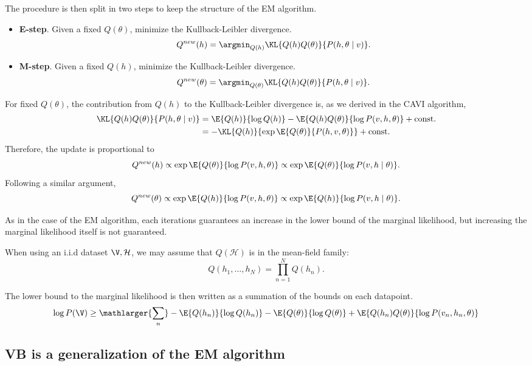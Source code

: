 The procedure is then split in two steps to keep the structure of the EM algorithm.

\begin{itemize}
  \item \textbf{E-step}. Given a fixed \(Q(\theta)\), minimize the Kullback-Leibler divergence.
    \[
    Q^{new}(h) = \argmin_{Q(h)}\KL{Q(h)Q(\theta)}{P(h,\theta \mid v)}.
    \]

  \item \textbf{M-step}. Given a fixed \(Q(h)\), minimize the Kullback-Leibler divergence.
    \[
    Q^{new}(\theta) = \argmin_{Q(\theta)}\KL{Q(h)Q(\theta)}{P(h,\theta \mid v)}.
    \]
\end{itemize}

For fixed \( Q(\theta) \), the contribution from \( Q(h) \) to the Kullback-Leibler divergence is, as we derived in the CAVI algorithm, 
\[
  \begin{aligned}
  \KL{Q(h)Q(\theta)}{P(h,\theta \mid v)} &= \E{Q(h)}{\log Q(h)} - \E{Q(h)Q(\theta)}{\log P(v,h,\theta)} + \text{const.} \\
  &= - \KL{Q(h)}{\exp \E{Q(\theta)}{P(h, v, \theta)}} + \text{const.}
  \end{aligned}
\]
Therefore, the update is proportional to 
\[
   Q^{new}(h) \propto \exp \E{Q(\theta)}{\log P(v,h,\theta)} \propto \exp \E{Q(\theta)}{\log P(v,h \mid \theta)}.
\]
Following a similar argument, 
\[
  Q^{new}(\theta) \propto \exp \E{Q(h)}{\log P(v,h,\theta)} \propto \exp \E{Q(h)}{\log P(v,h \mid \theta)}.
\]

As in the case of the EM algorithm, each iterations guarantees an increase in the lower bound of the marginal likelihood, but increasing the marginal likelihood itself is not guaranteed.

When using an i.i.d dataset \(\V, \mathcal{H}\), we may assume that \(Q(\mathcal{H})\) is in the mean-field family:
\[
  Q(h_{1}, \dots, h_{N}) = \prod_{n=1}^{N}Q(h_{n}).
\]

The lower bound to the marginal likelihood is then written as a summation of the bounds on each datapoint.
\[
  \log{P(\V)} \geq \mathlarger{\sum_{n}} -\E{Q(h_{n})}{\log{Q(h_{n})}}- \E{Q(\theta)}{\log{Q(\theta)}} + \E{Q(h_{n})Q(\theta)}{\log{P(v_{n}, h_{n},\theta)}}
\]

\subsection{VB is a generalization of the EM algorithm}

